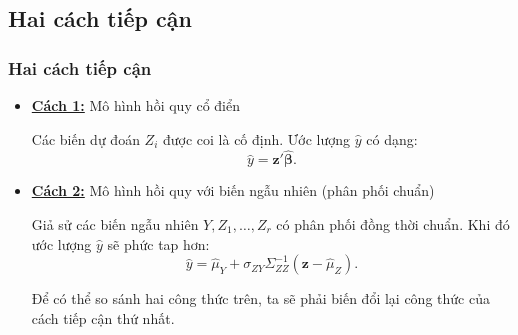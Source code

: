 \subsection{Hai cách tiếp cận}
\begin{frame}
\frametitle{Hai cách tiếp cận}
\begin{itemize}
\item \underline{\textbf{Cách 1:}} Mô hình hồi quy cổ điển 

Các biến dự đoán $Z_i$ được coi là cố định.
Ước lượng $\hat{y}$ có dạng:
\begin{equation}
\hat{y} = \bm{z}'\hat{\bm{\beta}}. \label{eq:91}
\end{equation}

\item \underline{\textbf{Cách 2:}} Mô hình hồi quy với biến ngẫu nhiên (phân phối chuẩn)

Giả sử các biến ngẫu nhiên $Y, Z_1,\dots,Z_r$ có phân phối đồng thời chuẩn.
Khi đó ước lượng $\hat{y}$ sẽ phức tap hơn:
\begin{equation}\label{eq:ml}
\hat y = \hat \mu_Y + \sigma_{ZY}\Sigma_{ZZ}^{-1}(\bm z - \hat\mu_Z).
\end{equation}


Để có thể so sánh hai công thức trên, ta sẽ phải biến đổi lại công thức của cách tiếp cận thứ nhất.
\end{itemize}

\end{frame}

